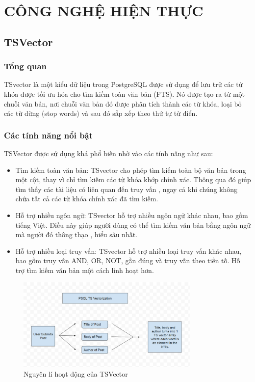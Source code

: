 \section{CÔNG NGHỆ HIỆN THỰC}
\subsection{TSVector}
\subsubsection{Tổng quan}
\hspace*{1cm} TSvector là một kiểu dữ liệu trong PostgreSQL được sử dụng để lưu trữ các từ khóa được tối ưu hóa cho tìm kiếm toàn văn bản (FTS). Nó được tạo ra từ một chuỗi văn bản, nơi chuỗi văn bản đó được phân tích thành các từ khóa, loại bỏ các từ dừng (stop words) và sau đó sắp xếp theo thứ tự từ điển.
\subsubsection{Các tính năng nổi bật}
TSVector được sử dụng khá phổ biến nhờ vào các tính năng như sau:
\begin{itemize}
    \item Tìm kiếm toàn văn bản: TSvector cho phép tìm kiếm toàn bộ văn bản trong một cột, thay vì chỉ tìm kiếm các từ khóa khớp chính xác. Thông qua đó giúp tìm thấy các tài liệu có liên quan đến truy vấn , ngay cả khi chúng không chứa tất cả các từ khóa chính xác đã tìm kiếm.
    \item Hỗ trợ nhiều ngôn ngữ: TSvector hỗ trợ nhiều ngôn ngữ khác nhau, bao gồm tiếng Việt. Điều này giúp người dùng có thể tìm kiếm văn bản bằng ngôn ngữ mà người đó thông thạo , hiểu sâu nhất.
    \item Hỗ trợ nhiều loại truy vấn: TSvector hỗ trợ nhiều loại truy vấn khác nhau, bao gồm truy vấn AND, OR, NOT, gần đúng và truy vấn theo tiền tố. Hỗ trợ tìm kiếm văn bản một cách linh hoạt hơn.
\end{itemize}
\begin{figure}[H]
    \centering
    \includegraphics[width=0.8\textwidth]{Images/technology/TSVector.png}
    \caption{Nguyên lí hoạt động của TSVector}
\end{figure}
